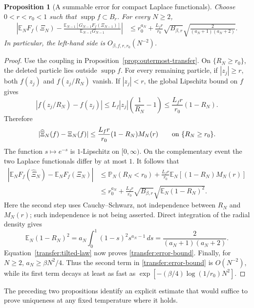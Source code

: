 \documentclass[11pt,a4paper]{article}
\numberwithin{equation}{section}
\newtheorem{proposition}[theorem]{Proposition}
\theoremstyle{definition}
\theoremstyle{remark}
\newcommand{\E}{\mathbb E}
\newcommand{\Pbb}{\mathbb P}
\newcommand{\supp}{\operatorname{supp}}
\begin{document}
\begin{proposition}[A summable error for compact Laplace functionals]
\label{prop:transfer-error}
Choose $0<r<r_0<1$ such that $\supp f\subset B_r$. For every $N\ge2$,
\begin{align}
 \left|\E_N F_f(\Xi_N)-
 \frac{\E_{N-1}[G_{N-1}F_f(\Xi_{N-1})]}
      {\E_{N-1}G_{N-1}}\right|
 &\le r_0^{a_N}
  +\frac{L_fr}{r_0}\sqrt{B_{\beta,r}}
       \sqrt{\frac{2}{(a_N+1)(a_N+2)}}.
 \label{transfer:error-bound}
\end{align}
In particular, the left-hand side is $O_{\beta,f,r,r_0}(N^{-2})$.
\end{proposition}

\begin{proof}
Use the coupling in Proposition~\ref{prop:outermost-transfer}.
On $\{R_N\ge r_0\}$, the deleted particle lies outside $\supp f$.
For every remaining particle, if $|z_j|\ge r$, both
$f(z_j)$ and $f(z_j/R_N)$ vanish. If $|z_j|<r$, the global Lipschitz
bound on $f$ gives
\[
 |f(z_j/R_N)-f(z_j)|
 \le L_f|z_j|\left(\frac1{R_N}-1\right)
 \le\frac{L_fr}{r_0}(1-R_N).
\]
Therefore
\[
 |\widehat\Xi_N(f)-\Xi_N(f)|
 \le\frac{L_fr}{r_0}(1-R_N)M_N(r)
 \qquad\hbox{on }\{R_N\ge r_0\}.
\]
The function $s\mapsto e^{-s}$ is $1$-Lipschitz on $[0,\infty)$.
On the complementary event the two Laplace functionals differ by at
most $1$. It follows that
\begin{align*}
 |\E_NF_f(\widehat\Xi_N)-\E_NF_f(\Xi_N)|
 &\le \Pbb_N(R_N<r_0)
    +\frac{L_fr}{r_0}\E_N[(1-R_N)M_N(r)]\\
 &\le r_0^{a_N}
    +\frac{L_fr}{r_0}\sqrt{B_{\beta,r}}
          \sqrt{\E_N(1-R_N)^2}.
\end{align*}
Here the second step uses Cauchy--Schwarz, not independence between
$R_N$ and $M_N(r)$; such independence is not being asserted.
Direct integration of the radial density gives
\[
 \E_N(1-R_N)^2
 =a_N\int_0^1(1-s)^2s^{a_N-1}\,ds
 =\frac{2}{(a_N+1)(a_N+2)}.
\]
Equation~\eqref{transfer:tilted-law} now proves
\eqref{transfer:error-bound}. Finally, for $N\ge2$,
$a_N\ge\beta N^2/4$. Thus the second term in
\eqref{transfer:error-bound} is $O(N^{-2})$, while its first term
decays at least as fast as
$\exp[-(\beta/4)\log(1/r_0)N^2]$.
\end{proof}

The preceding two propositions identify an explicit estimate that
would suffice to prove uniqueness at any fixed temperature where it holds.
\end{document}
